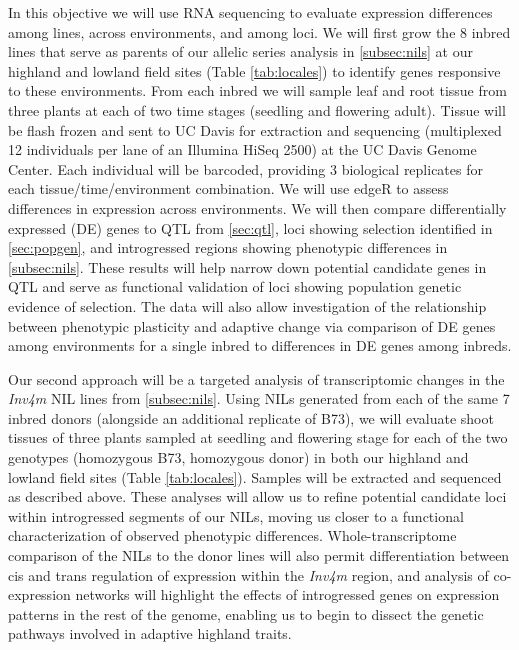 In this objective we will use RNA sequencing to evaluate expression differences among lines, across environments, and among loci.  We will first grow the 8 inbred lines that serve as parents of our allelic series analysis in \ref{subsec:nils} at our highland and lowland field sites (Table \ref{tab:locales})  to identify genes responsive to these environments.  From each inbred we will sample leaf and root tissue from three plants at each of two time stages (seedling and flowering adult). Tissue will be flash frozen and sent to UC Davis for extraction and sequencing (multiplexed 12 individuals per lane of an Illumina HiSeq 2500) at the UC Davis Genome Center. Each individual will be barcoded, providing 3 biological replicates for each tissue/time/environment combination. We will use edgeR \citep{robinson2010edger} to assess differences in expression across environments.  We will then compare differentially expressed (DE) genes to QTL from \ref{sec:qtl}, loci showing selection identified in \ref{sec:popgen}, and introgressed regions showing phenotypic differences in \ref{subsec:nils}.   These results will help narrow down potential candidate genes in QTL and serve as functional validation of loci showing population genetic evidence of selection.  The data will also allow investigation of the relationship between phenotypic plasticity and adaptive change \citep[c.f.][]{Rosas26082013} via comparison of DE genes among environments for a single inbred to differences in DE genes among inbreds.  

Our second approach will be a targeted analysis of transcriptomic changes in the \emph{Inv4m} NIL lines from \ref{subsec:nils}.  Using NILs generated from each of the same 7 inbred donors (alongside an additional replicate of B73), we will evaluate shoot tissues of three plants sampled at seedling and flowering stage for each of the two genotypes (homozygous B73, homozygous donor) in both our highland and lowland field sites (Table \ref{tab:locales}).  Samples will be extracted and sequenced as described above. These analyses will allow us to refine potential candidate loci within introgressed segments of our NILs, moving us closer to a functional characterization of observed phenotypic differences. Whole-transcriptome comparison of the NILs to the donor lines will also permit differentiation between cis and trans regulation of expression within the \emph{Inv4m}  region, and analysis of co-expression networks \citep[c.f.][]{Swanson-Wagner02072012} will highlight the effects of introgressed genes on expression patterns in the rest of the genome, enabling us to begin to dissect the genetic pathways involved in adaptive highland traits.

